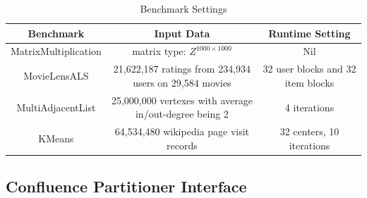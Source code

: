 \documentclass[10pt,journal,compsoc]{IEEEtran}
\begin{document}
\begin{table}[!t]
\renewcommand{\arraystretch}{1}
\caption{Benchmark Settings}
\label{table:benchmark}
\centering
\begin{tabularx}{0.85\textwidth}{ c || c | c }
\hline
\textbf{Benchmark} & \textbf{Input Data} & \textbf{Runtime Setting} \\
\hline
MatrixMultiplication & matrix type: $Z^{1000 \times 1000}$ & Nil\\
\hline
MovieLensALS & 21,622,187 ratings from 234,934 users on 29,584 movies &32 user blocks and 32 item blocks\\%
\hline
MultiAdjacentList & 25,000,000 vertexes with average in/out-degree being 2& 4 iterations \\%
\hline
KMeans & 64,534,480 wikipedia page visit records& 32 centers, 10 iterations \\
\hline
\end{tabularx}
\end{table}


\subsection{Confluence Partitioner Interface}
\end{document}
